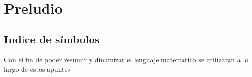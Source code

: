 \part*{Preludio}
\chapter*{Indice de símbolos}
\noindent
Con el fin de poder resumir y dinamizar el lenguaje matemático se utilizarán a lo largo de estos apuntes 

